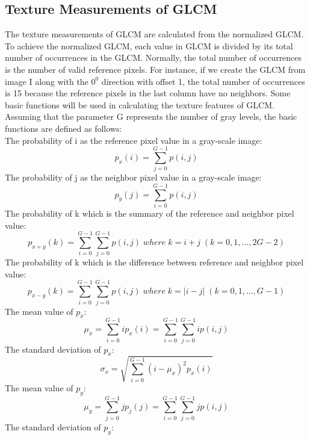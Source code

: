 \subsection{Texture Measurements of GLCM}
The texture measurements of GLCM are calculated from the normalized GLCM. To achieve the normalized GLCM, each value in GLCM is divided by its total number of occurrences in the GLCM. Normally, the total number of occurrences is the number of valid reference pixels. For instance, if we create the GLCM from image I along with the $0^0$ direction with offset 1, the total number of occurrences is 15 because the reference pixels in the last column have no neighbors. Some basic functions will be used in calculating the texture features of GLCM\cite{Haralick}. Assuming that the parameter G represents the number of gray levels, the basic functions are defined as follows:\\
The probability of i as the reference pixel value in a gray-scale image:
\begin{equation}
    p_x(i) = \sum_{j=0}^{G-1}p(i,j) 
\end{equation}
The probability of j as the neighbor pixel value in a gray-scale image:
\begin{equation}
    p_y(j) = \sum_{i=0}^{G-1}p(i,j)
\end{equation}
The probability of k which is the summary of the reference and neighbor pixel value:
\begin{equation}
    p_{x+y}(k) = \sum_{i=0}^{G-1}\sum_{j=0}^{G-1} p(i,j) \; where\; k = i + j\;(k=0,1,\ldots,2G-2)
\end{equation}
The probability of k which is the difference between reference and neighbor pixel value:
\begin{equation}
    p_{x-y}(k) = \sum_{i=0}^{G-1}\sum_{j=0}^{G-1} p(i,j) \; where\; k = |i - j|\;(k=0,1,\ldots,G-1)
\end{equation}
The mean value of $p_x$:
\begin{equation}
\mu_x = \sum_{i=0}^{G-1}ip_x(i)=\sum_{i=0}^{G-1}\sum_{j=0}^{G-1} ip(i,j)
\end{equation}
The standard deviation of $p_x$:
\begin{equation}
\sigma_x = \sqrt{\sum_{i=0}^{G-1}(i-\mu_x)^2p_x(i)}
\end{equation}
The mean value of $p_y$:
\begin{equation}
\mu_y = \sum_{j=0}^{G-1}jp_j(j)=\sum_{i=0}^{G-1}\sum_{j=0}^{G-1} jp(i,j)
\end{equation}
The standard deviation of $p_y$:
